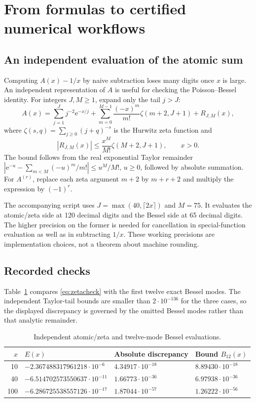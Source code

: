 \documentclass[11pt,a4paper]{article}
\theoremstyle{definition}
\theoremstyle{remark}
\newcommand{\e}{\mathrm e}
\numberwithin{equation}{section}
\begin{document}
\section{From formulas to certified numerical workflows}\label{sec:computations}

\subsection{An independent evaluation of the atomic sum}
Computing $A(x)-1/x$ by naive subtraction loses many digits once $x$ is large. An independent representation of $A$ is useful for checking the Poisson--Bessel identity. For integers $J,M\ge1$, expand only the tail $j>J$:
\begin{equation}\label{eq:zetacheck}
 A(x)=\sum_{j=1}^{J}j^{-2}\e^{-x/j}
 +\sum_{m=0}^{M-1}\frac{(-x)^m}{m!}\zeta(m+2,J+1)+R_{J,M}(x),
\end{equation}
where $\zeta(s,q)=\sum_{j\ge0}(j+q)^{-s}$ is the Hurwitz zeta function and
\begin{equation}\label{eq:zetabound}
 |R_{J,M}(x)|\le\frac{x^M}{M!}\zeta(M+2,J+1),\qquad x>0.
\end{equation}
The bound follows from the real exponential Taylor remainder $|\e^{-u}-\sum_{m<M}(-u)^m/m!|\le u^M/M!$, $u\ge0$, followed by absolute summation. For $A^{(r)}$, replace each zeta argument $m+2$ by $m+r+2$ and multiply the expression by $(-1)^r$.

The accompanying script uses $J=\max(40,\lceil2x\rceil)$ and $M=75$. It evaluates the atomic/zeta side at 120 decimal digits and the Bessel side at 65 decimal digits. The higher precision on the former is needed for cancellation in special-function evaluation as well as in subtracting $1/x$. These working precisions are implementation choices, not a theorem about machine rounding.

\subsection{Recorded checks}
Table~\ref{tab:besselchecks} compares \eqref{eq:zetacheck} with the first twelve exact Bessel modes. The independent Taylor-tail bounds are smaller than $2\cdot10^{-136}$ for the three cases, so the displayed discrepancy is governed by the omitted Bessel modes rather than that analytic remainder.

\begin{table}[ht]
\centering\small
\caption{Independent atomic/zeta and twelve-mode Bessel evaluations.}\label{tab:besselchecks}
\begin{tabular}{@{}rlll@{}}
\toprule
$x$ & $E(x)$ & Absolute discrepancy & Bound $B_{12}(x)$\\
\midrule
10 & $-2.367488317961218\cdot10^{-6}$ & $4.34917\cdot10^{-18}$ & $8.89430\cdot10^{-18}$\\
40 & $-6.514702573550637\cdot10^{-11}$ & $1.66773\cdot10^{-36}$ & $6.97938\cdot10^{-36}$\\
100 & $-6.286725538557126\cdot10^{-17}$ & $1.87044\cdot10^{-57}$ & $1.26222\cdot10^{-56}$\\
\bottomrule
\end{tabular}
\end{table}
\end{document}
